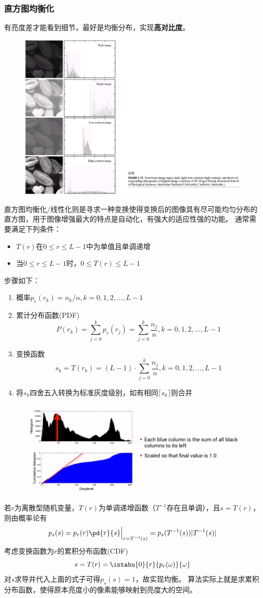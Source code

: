 \subsubsection{直方图均衡化}
有亮度差才能看到细节，最好是均衡分布，实现\textbf{高对比度}。
\begin{figure}[H]
\centering
\includegraphics[width=0.6\linewidth]{fig/histogram-quality.png}
\end{figure}

直方图均衡化/线性化则是寻求一种变换使得变换后的图像具有尽可能均匀分布的直方图，用于图像增强最大的特点是自动化，有强大的适应性强的功能。
通常需要满足下列条件：
\begin{itemize}
	\item $T(r)$在$0\leq r\leq L-1$中为单值且单调递增
	\item 当$0\leq r\leq L-1$时，$0\leq T(r)\leq L-1$
\end{itemize}
步骤如下：
\begin{enumerate}
	\item 概率$p_r(r_k)=n_k/n,k=0,1,2,\ldots,L-1$
	\item 累计分布函数(PDF)
	\[P(r_k)=\sum_{j=0}^k p_r(r_j)=\sum_{j=0}^k\frac{n_j}{n},k=0,1,2,\ldots,L-1\]
	\item 变换函数
	\[s_k=T(r_k)=(L-1)\cdot\sum_{j=0}^k\frac{n_j}{n},k=0,1,2,\ldots,L-1\]
	\item 将$s_k$四舍五入转换为标准灰度级别，如有相同$\lceil s_k\rceil$则合并
\end{enumerate}
\begin{figure}[H]
\centering
\includegraphics[width=0.8\linewidth]{fig/histogram-normalization.png}
\end{figure}
\begin{analysis}
若$r$为离散型随机变量，$T(r)$为单调递增函数（$T^{-1}$存在且单调），且$s=T(r)$，则由概率论有
\[p_s(s)=p_r(r)\pd{r}{s}\Big|_{r=T^{-1}(s)}=p_s(T^{-1}(s))|T^{-1}(s)|\]
考虑变换函数为$r$的累积分布函数(CDF)
\[s=T(r)=\intabu{0}{r}{p_r(\omega)}{\omega}\]
对$s$求导并代入上面的式子可得$p_s(s)=1$，故实现均衡。
算法实际上就是求累积分布函数，使得原本亮度小的像素能够映射到亮度大的空间。
\end{analysis}

